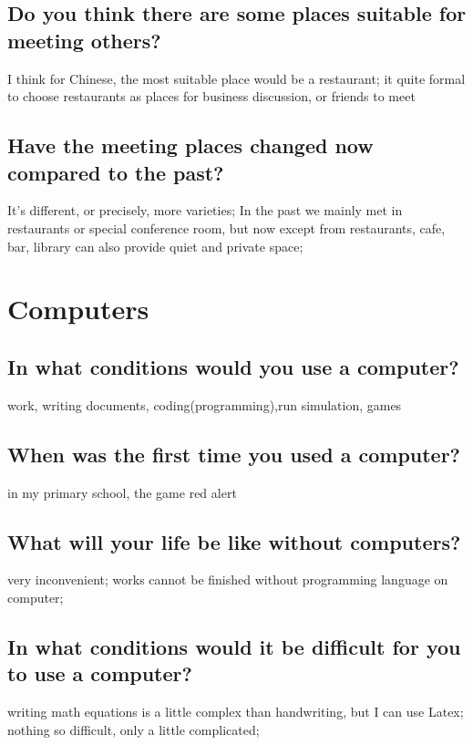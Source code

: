 \documentclass[conference]{IEEEtran}
\begin{document}
\subsection{Do you think there are some places suitable for meeting others?}
I think for Chinese, the most suitable place would be a restaurant;
it quite formal to choose restaurants as places for business discussion,
or friends to meet
\subsection{Have the meeting places changed now compared to the past?}
It's different, or precisely, more varieties;
In the past we mainly met in restaurants or special conference room, 
but now except from restaurants, cafe, bar, library can also provide quiet and
private space;

\section{Computers}
\subsection{In what conditions would you use a computer?}
work, writing documents, coding(programming),run simulation, games
\subsection{When was the first time you used a computer?}
in my primary school, the game red alert
\subsection{What will your life be like without computers?}
very inconvenient; works cannot be finished without programming language on computer;
\subsection{In what conditions would it be difficult for you to use a computer?}
writing math equations is a little complex than handwriting, but I can use Latex;
nothing so difficult, only a little complicated;
\end{document}
